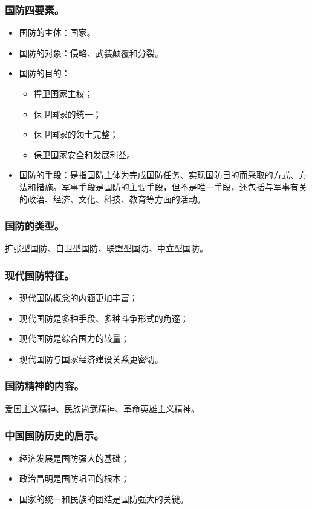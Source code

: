 \documentclass{article}
\begin{document}
\subsubsection{国防四要素。}
\begin{itemize}
    \item 国防的主体：国家。
    \item 国防的对象：侵略、武装颠覆和分裂。
    \item 国防的目的：
    \begin{itemize}
        \item 捍卫国家主权；
        \item 保卫国家的统一；
        \item 保卫国家的领土完整；
        \item 保卫国家安全和发展利益。
    \end{itemize}
    \item 国防的手段：是指国防主体为完成国防任务、实现国防目的而采取的方式、方法和措施。军事手段是国防的主要手段，但不是唯一手段，还包括与军事有关的政治、经济、文化、科技、教育等方面的活动。
\end{itemize}
    
\subsubsection{国防的类型。}
扩张型国防、自卫型国防、联盟型国防、中立型国防。

\subsubsection{现代国防特征。}
\begin{itemize}
    \item 现代国防概念的内涵更加丰富；
    \item 现代国防是多种手段、多种斗争形式的角逐；
    \item 现代国防是综合国力的较量；
    \item 现代国防与国家经济建设关系更密切。
\end{itemize}

\subsubsection{国防精神的内容。}
爱国主义精神、民族尚武精神、革命英雄主义精神。

\subsubsection{中国国防历史的启示。}
\begin{itemize}
    \item 经济发展是国防强大的基础；
    \item 政治昌明是国防巩固的根本；
    \item 国家的统一和民族的团结是国防强大的关键。
\end{itemize}
\end{document}
